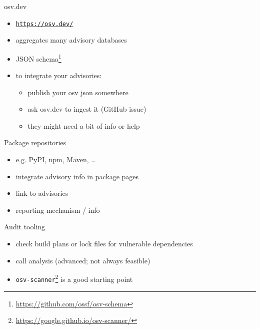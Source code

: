 \documentclass[ignorenonframetext,aspectratio=169,12pt]{beamer}
\begin{document}
\begin{frame}{osv.dev}
  \begin{itemize}
    \item \texttt{\url{https://osv.dev/}}
    \item aggregates many advisory databases
    \item JSON schema\footnote{\url{https://github.com/ossf/osv-schema}}
    \item to integrate your advisories:
      \begin{itemize}
        \item publish your osv json somewhere
        \item ask osv.dev to ingest it (GitHub issue)
        \item they might need a bit of info or help
    \end{itemize}
  \end{itemize}
\end{frame}

\begin{frame}{Package repositories}
  \begin{itemize}
    \item e.g. PyPI, npm, Maven, \ldots{}
    \item integrate advisory info in package pages
    \item link to advisories
    \item reporting mechanism / info
  \end{itemize}
\end{frame}

\begin{frame}{Audit tooling}
  \begin{itemize}
    \item check build plans or lock files for vulnerable dependencies
    \item call analysis (advanced; not always feasible)
    \item {\tt osv-scanner}\footnote{\url{https://google.github.io/osv-scanner/}}
      is a good starting point
  \end{itemize}
\end{frame}
\end{document}
